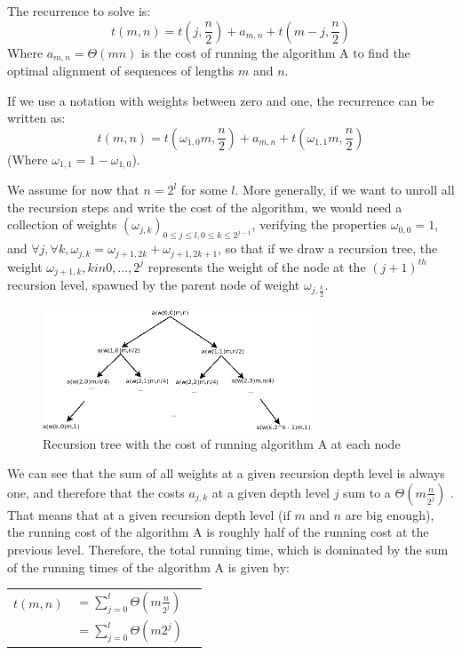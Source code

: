 The recurrence to solve is:
$$t(m,n) = t(j,\frac{n}{2}) + a_{m,n} + t(m-j,\frac{n}{2})$$
Where $a_{m,n} = \Theta(mn)$ is the cost of running the algorithm A to find the optimal alignment of sequences of lengths $m$ and $n$.

If we use a notation with weights between zero and one, the recurrence can be written as:
$$t(m,n) = t(\omega_{1,0} m,\frac{n}{2}) + a_{m,n} + t( \omega_{1,1}m,\frac{n}{2})$$
(Where $\omega_{1,1} = 1-\omega_{1,0}$).

We assume for now that $n=2^l$ for some $l$.
\newline
More generally, if we want to unroll all the recursion steps and write the cost of the algorithm, we would need a collection of weights $(\omega_{j,k})_{0 \leq j \leq l , 0 \leq k \leq 2^{j-1} }$, verifying the properties $\omega_{0,0} = 1$, and $\forall j, \forall k, \omega_{j,k} = \omega_{j+1, 2k} + \omega_{j+1, 2k+1}$, so that if we draw a recursion tree, the weight $\omega_{j+1,k}, k in 0,...,2^j$ represents the weight of the node at the $(j+1)^{th}$ recursion level, spawned by the parent node of weight $\omega_{j, \frac{k}{2}  }$.

\begin{figure}[h!]
\begin{center}
   \includegraphics[width=8cm]{recursionTree}
   \caption{Recursion tree with the cost of running algorithm A at each node}
\end{center}
\end{figure}

We can see that the sum of all weights at a given recursion depth level is always one, and therefore that the costs $a_{j,k}$ at a given depth level $j$ sum to a $\Theta(m \frac{n}{2^j})$ . That means that at a given recursion depth level (if $m$ and $n$ are big enough), the running cost of the algorithm A is roughly half of the running cost at the previous level.
\newline
\newline
Therefore, the total running time, which is dominated by the sum of the running times of the algorithm A is given by:

\begin{tabular}{lll}
$t(m,n)$ & $ = \sum_{j=0}^{l} {\Theta(m \frac{n}{2^j})}$
\\ & $ = \sum_{j=0}^{l} { \Theta(m 2^j)}$
\end{tabular}


